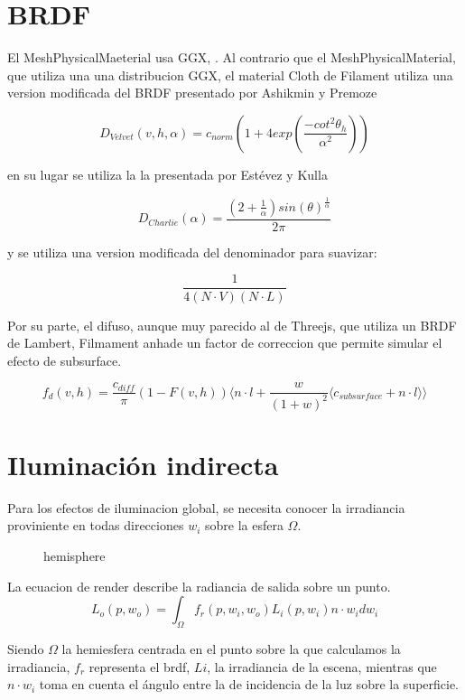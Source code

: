 \section{BRDF}
El MeshPhysicalMaeterial usa GGX, \autocite{ggx}.
Al contrario que el MeshPhysicalMaterial, que utiliza una una distribucion GGX, el material
Cloth de Filament utiliza una  version modificada del BRDF presentado por Ashikmin y Premoze
\autocite{velvet}

$$
D_{Velvet}(v, h, \alpha) = c_{norm} (
	1 + 4exp \left(\frac{-cot^2\theta_h}{\alpha^2}\right)
)
$$

en su lugar se utiliza la la presentada por Est\'evez y Kulla \autocite{sheen}

$$
  D_{Charlie}(\alpha) = \frac
    {(2 + \frac{1}{\alpha})sin(\theta)^\frac{1}{\alpha}}
    {2\pi}
$$

y se utiliza una version modificada del denominador para suavizar:

$$
\frac{1}{4(N\cdot{V})(N\cdot{L})}
$$

Por su parte, el difuso, aunque muy parecido al de Threejs, que utiliza un BRDF de Lambert,
Filmament anhade un factor de correccion que permite simular el efecto de subsurface.

$$
f_d(v, h) = \frac{c_{diff}}{\pi}(1 - F(v, h))
\Bigg\langle
n\cdot{l} + \frac{w}{(1+ w)^2}\langle c_{subsurface} + n \cdot{l} \rangle
\Bigg\rangle
$$

\section{Iluminaci\'on indirecta}
Para los efectos de iluminacion global, se necesita conocer la irradiancia proviniente en todas
direcciones $w_i$ sobre la esfera $\Omega$.

\begin{figure}[H]
  \vspace{0.5cm}
  \centering
  \caption{hemisphere}
\end{figure}

La ecuacion de render describe la radiancia de salida sobre un punto.
$$
L_o(p, w_o) = \int_{\Omega} f_r(p, w_i, w_o)L_i(p, w_i)n\cdot{w_i}dw_i
$$

Siendo $\Omega$ la hemiesfera centrada en el punto sobre la que calculamos la irradiancia,
$f_r$ representa el brdf, $Li$, la irradiancia de la escena, mientras que $n\cdot{w_i}$ toma en
cuenta el \'angulo entre la de incidencia de la luz sobre la superficie.

